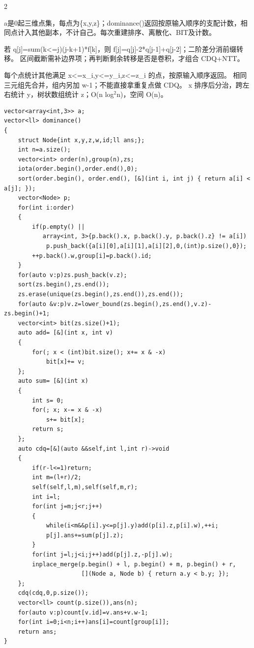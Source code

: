 \documentclass[UTF8,fontset=fandol,a4paper,twoside]{ctexart}
\newcommand{\note}[1]{{\fontsize{10}{12}\selectfont #1\par}}
\begin{document}
\begin{multicols}{2}
\note{a是0起三维点集，每点为\{x,\allowbreak{}y,\allowbreak{}z\}；dominance(\allowbreak{})\allowbreak{}返回按原输入顺序的支配计数，相同点计入其他副本，不计自己。每次重建排序、离散化、BIT及计数。}
\note{若 q[\allowbreak{}j]\allowbreak{}=\allowbreak{}sum(\allowbreak{}k<\allowbreak{}=\allowbreak{}j)\allowbreak{}(\allowbreak{}j-\allowbreak{}k+\allowbreak{}1)\allowbreak{}*f[\allowbreak{}k]\allowbreak{}，则 f[\allowbreak{}j]\allowbreak{}=\allowbreak{}q[\allowbreak{}j]\allowbreak{}-\allowbreak{}2*q[\allowbreak{}j-\allowbreak{}1]\allowbreak{}+\allowbreak{}q[\allowbreak{}j-\allowbreak{}2]\allowbreak{}；二阶差分消前缀转移。 区间截断需补边界项；再判断剩余转移是否是卷积，才组合 CDQ+\allowbreak{}NTT。}
\note{每个点统计其他满足 x<\allowbreak{}=\allowbreak{}x\_i,\allowbreak{}y<\allowbreak{}=\allowbreak{}y\_i,\allowbreak{}z<\allowbreak{}=\allowbreak{}z\_i 的点，按原输入顺序返回。 相同三元组先合并，组内另加 w-\allowbreak{}1；不能直接拿重复点做 CDQ。 x 排序后分治，跨左右统计 y，树状数组统计 z；O(\allowbreak{}n log\ensuremath{^2}n)\allowbreak{}，空间 O(\allowbreak{}n)\allowbreak{}。}
\begin{lstlisting}
vector<array<int,3>> a;
vector<ll> dominance()
{
    struct Node{int x,y,z,w,id;ll ans;};
    int n=a.size();
    vector<int> order(n),group(n),zs;
    iota(order.begin(),order.end(),0);
    sort(order.begin(), order.end(), [&](int i, int j) { return a[i] < a[j]; });
    vector<Node> p;
    for(int i:order)
    {
        if(p.empty() ||
           array<int, 3>{p.back().x, p.back().y, p.back().z} != a[i])
            p.push_back({a[i][0],a[i][1],a[i][2],0,(int)p.size(),0});
        ++p.back().w,group[i]=p.back().id;
    }
    for(auto v:p)zs.push_back(v.z);
    sort(zs.begin(),zs.end());
    zs.erase(unique(zs.begin(),zs.end()),zs.end());
    for(auto &v:p)v.z=lower_bound(zs.begin(),zs.end(),v.z)-zs.begin()+1;
    vector<int> bit(zs.size()+1);
    auto add= [&](int x, int v)
    {
        for(; x < (int)bit.size(); x+= x & -x)
            bit[x]+= v;
    };
    auto sum= [&](int x)
    {
        int s= 0;
        for(; x; x-= x & -x)
            s+= bit[x];
        return s;
    };
    auto cdq=[&](auto &&self,int l,int r)->void
    {
        if(r-l<=1)return;
        int m=(l+r)/2;
        self(self,l,m),self(self,m,r);
        int i=l;
        for(int j=m;j<r;j++)
        {
            while(i<m&&p[i].y<=p[j].y)add(p[i].z,p[i].w),++i;
            p[j].ans+=sum(p[j].z);
        }
        for(int j=l;j<i;j++)add(p[j].z,-p[j].w);
        inplace_merge(p.begin() + l, p.begin() + m, p.begin() + r,
                      [](Node a, Node b) { return a.y < b.y; });
    };
    cdq(cdq,0,p.size());
    vector<ll> count(p.size()),ans(n);
    for(auto v:p)count[v.id]=v.ans+v.w-1;
    for(int i=0;i<n;i++)ans[i]=count[group[i]];
    return ans;
}
\end{lstlisting}

\end{multicols}
\end{document}

